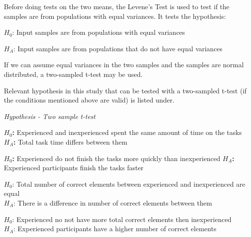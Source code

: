 Before doing tests on the two means, the Levene's Test is used to test if the samples are from populations with equal variances. It tests the hypothesis:\newline %

\centerline{$H_{0}$: Input samples are from populations with equal variances} 
\centerline{$H_{A}$: Input samples are from populations that do not have equal variances}

If we can assume equal variances in the two samples and the samples are normal distributed, a two-sampled t-test may be used. 


Relevant hypothesis in this study that can be tested with a two-sampled t-test (if the conditions mentioned above are valid) is listed under. \newline

\begin{framed}{\noindent\centering
		
		\textit{Hypothesis - Two sample t-test} \newline
		
		\textbf{$H_{0}$:} Experienced and inexperienced spent the same amount of time on the tasks\\
		\textbf{$H_{A}$:} Total task time differs between them \newline
		
		\textbf{$H_{0}$:} Experienced do not finish the tasks more quickly than inexperienced\newline
		\textbf{$H_{A}$:} Experienced participants finish the tasks faster\newline
		
		$H_{0}$: Total number of correct elements between experienced and inexperienced are equal \\
		$H_{A}$: There is a difference in number of correct elements between them\newline
		
		$H_{0}$: Experienced no not have more total correct elements then inexperienced\\
		$H_{A}$: Experienced participants have a higher number of correct elements\newline
		
		\par}
\end{framed}

